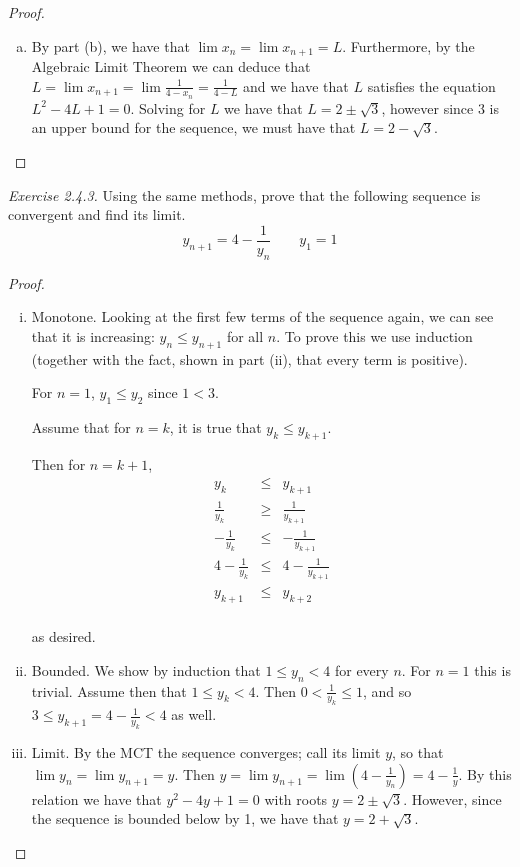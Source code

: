 \begin{proof}
\begin{enumerate}[(a)]
							\item By part (b), we have that  $\lim x_n = \lim x_{n+1} = L$. Furthermore, by the Algebraic Limit Theorem we can deduce that $L = \lim x_{n+1} = \lim \frac{1}{4-x_n} = \frac{1}{4-L}$ and we have that $L$ satisfies the equation $L^2 - 4L +1 =0$.  Solving for $L$ we have that $L = 2 \pm \sqrt{3}$, however since $3$ is an upper bound for the sequence, we must have that $L= 2 - \sqrt{3}$.
			\end{enumerate}
		
		\end{proof}
		
\noindent		
\emph{Exercise 2.4.3.} Using the same methods, prove that the following sequence is convergent and find its limit.
	$$y_{n+1} = 4 - \frac{1}{y_n}	\qquad y_1 = 1$$
	
	\begin{proof}
		\begin{enumerate}[(i)]
			\item Monotone.  Looking at the first few terms of the sequence again, we can see that it is increasing: $y_n \leq y_{n+1}$ for all $n$.  To prove this we use induction (together with the fact, shown in part (ii), that every term is positive).
				
				For $n=1$, $y_1 \leq y_2$ since $1 < 3$.
				
				Assume that for $n=k$, it is true that $y_{k} \leq y_{k+1}$.
				
				Then for $n = k+1$, 
				\begin{eqnarray*}
y_{k}  &\leq & y_{k+1} \\
   	\frac{1}{y_{k}}  &\geq& \frac{1}{y_{k+1}} \\
    -\frac{1}{y_{k}}  &\leq& -\frac{1}{y_{k+1}}\\
      4- \frac{1}{y_{k}}  &\leq&4- \frac{1}{y_{k+1}}\\
   y_{k+1}  &\leq& y_{k+2} \\
\end{eqnarray*}

as desired.

\item Bounded.  We show by induction that $1 \leq y_n < 4$ for every $n$.  For $n=1$ this is trivial.  Assume then that $1 \leq y_k < 4$.  Then $0 < \frac{1}{y_k}\leq 1$, and so $3 \leq y_{k+1} = 4 - \frac{1}{y_k} < 4$ as well.

\item Limit.  By the MCT the sequence converges; call its limit $y$, so that $\lim y_n = \lim y_{n+1} = y$.  Then $y = \lim y_{n+1} =  \lim (4 - \frac{1}{y_n}) = 4 - \frac{1}{y}$.  By this relation we have that $y^2 - 4y + 1 =0$ with roots $y = 2 \pm \sqrt{3}$.  However, since the sequence is bounded below by 1, we have that $y = 2 + \sqrt{3}$.

				
		\end{enumerate}
	\end{proof}
	
